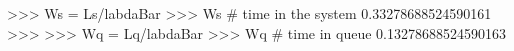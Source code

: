
>>> Ws = Ls/labdaBar
>>> Ws # time in the system
0.33278688524590161
>>>
>>> Wq = Lq/labdaBar
>>> Wq # time in queue
0.13278688524590163

